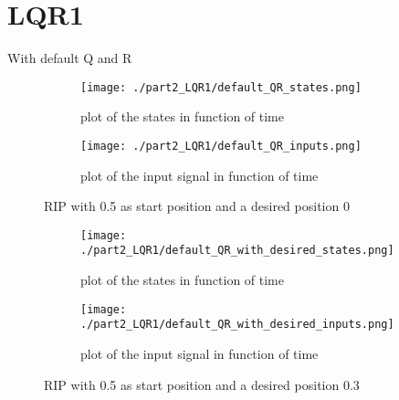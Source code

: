 \section{LQR1}
With default Q and R
\begin{figure}[H]
	\centering
	\begin{subfigure}[b]{0.45\textwidth}
		\texttt{[image: ./part2\_LQR1/default\_QR\_states.png]}
		\caption{plot of the states in function of time}
	\end{subfigure}
	\begin{subfigure}[b]{0.45\textwidth}
		\texttt{[image: ./part2\_LQR1/default\_QR\_inputs.png]}
		\caption{plot of the input signal in function of time}
	\end{subfigure}
	\caption{RIP with 0.5 as start position and a desired position 0}
\end{figure}

\begin{figure}[H]
	\centering
	\begin{subfigure}[b]{0.45\textwidth}
		\texttt{[image: ./part2\_LQR1/default\_QR\_with\_desired\_states.png]}
		\caption{plot of the states in function of time}
	\end{subfigure}
	\begin{subfigure}[b]{0.45\textwidth}
		\texttt{[image: ./part2\_LQR1/default\_QR\_with\_desired\_inputs.png]}
		\caption{plot of the input signal in function of time}
	\end{subfigure}
	\caption{RIP with 0.5 as start position and a desired position 0.3}
\end{figure}